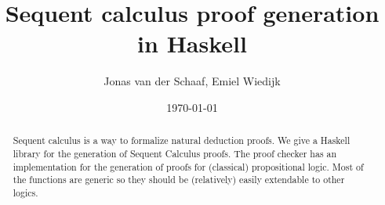 \documentclass[12pt,a4paper]{article}
\title{Sequent calculus proof generation in Haskell}
\author{Jonas van der Schaaf, Emiel Wiedijk}
\date{\today}
\begin{document}
\maketitle

\begin{abstract}
Sequent calculus is a way to formalize natural deduction proofs. We give a
Haskell library for the generation of Sequent Calculus proofs. The proof checker
has an implementation for the generation of proofs for (classical) propositional
logic. Most of the functions are generic so they should be (relatively) easily
extendable to other logics.
\end{abstract}

\vfill

\tableofcontents

\clearpage
















\end{document}
